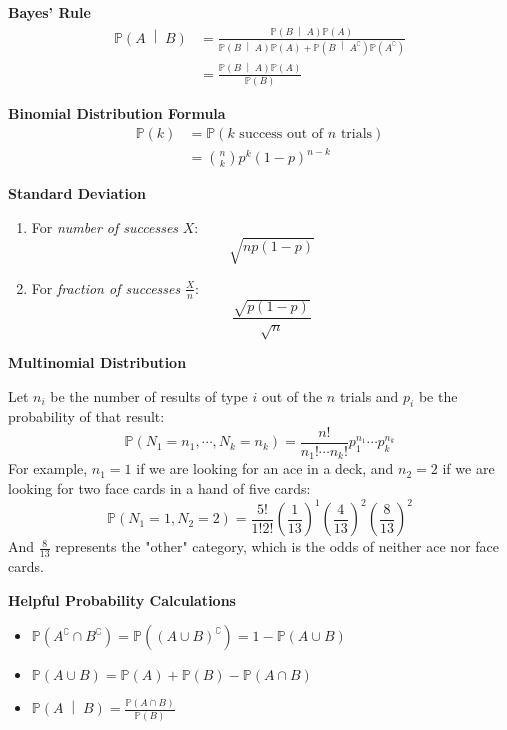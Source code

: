 \documentclass[titlepage, 12pt, leqno]{article}
\begin{document}
\setlength{\parskip}{1\baselineskip}
\setlength{\parindent}{0pt}
\newpage


\begin{multicols}{2}
\textbf{Bayes' Rule}
\begin{align*}
    \mathbb{P}\left(A \;\middle|\; B\right) &= \frac{ 
    \mathbb{P}\left(B \;\middle|\; A\right) \mathbb{P}(A)}{
\mathbb{P}\left(B \;\middle|\; A\right) \mathbb{P}(A) +
\mathbb{P}\left(B \;\middle|\; A^\complement \right) \mathbb{P}(A^\complement )}\\
&= \frac{ \mathbb{P}\left(B \;\middle|\; A\right) \mathbb{P}(A)}{\mathbb{P}(B)}
\end{align*}

\textbf{Binomial Distribution Formula }
\begin{align*}
    \mathbb{P}(k) &= \mathbb{P}( k\text{ success out of } n \text{ trials}) \\
                  &= \binom{n}{k}p^k(1-p)^{n-k}
\end{align*}

\textbf{Standard Deviation}
\begin{enumerate}
    \item For \textit{number of successes} $X$:
        \[
            \sqrt{np(1-p)}
        \]
    \item For \textit{fraction of successes} $\frac{X}{n}$:
        \[
        \frac{\sqrt{p(1-p)}}{\sqrt{n}}
        \]
\end{enumerate}

\textbf{Multinomial Distribution}

Let $n_i$ be the number of results of type $i$ out of the $n$ trials and $p_i$ be
the probability of that result:
\[
\mathbb{P}(N_1=n_1, \cdots , N_k=n_k) = \frac{n!}{n_1! \cdots n_k!}
p_1^{n_1} \cdots p_k^{n_k}
\]
For example, $n_1 =1$ if we are looking for an ace in a deck, and $n_2=2$ if
we are looking for two face cards in a hand of five cards:
\[
\mathbb{P}(N_1=1, N_2=2) = \frac{5!}{1!2!}\left(\frac{1}{13}\right)^1 
\left(\frac{4}{13}\right)^2 \left(\frac{8}{13}\right)^2
\]
And $\frac{8}{13}$ represents the "other" category, which is the odds of neither
ace nor face cards.

\textbf{Helpful Probability Calculations}
\begin{itemize}
    \item $\mathbb{P}(A^\complement \cap B^\complement) = 
        \mathbb{P}((A \cup B)^\complement) =
        1-\mathbb{P}(A \cup B)$
    \item $\mathbb{P}(A \cup B) = \mathbb{P}(A) + \mathbb{P}(B) -
        \mathbb{P}(A \cap B)$
    \item $ \mathbb{P}\left(A \;\middle|\; B\right) = 
        \frac{\mathbb{P}(A \cap B)}{\mathbb{P}(B)}$
\end{itemize}


\end{multicols}
\end{document}
